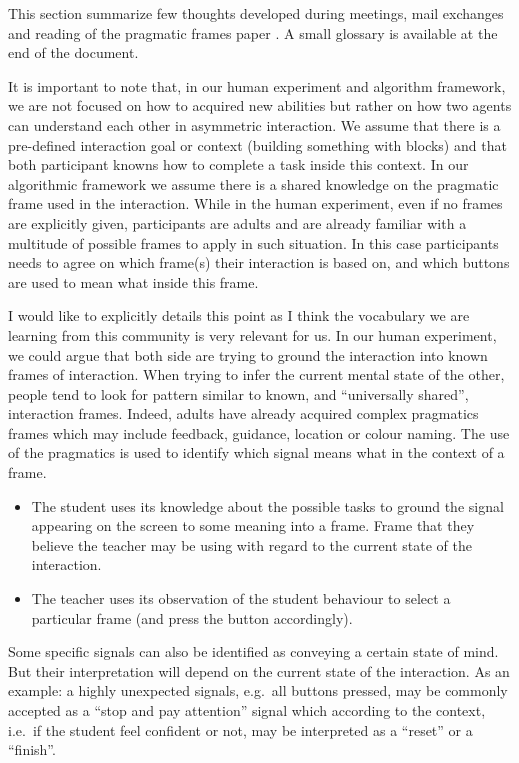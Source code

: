 This section summarize few thoughts developed during meetings, mail exchanges and reading of the pragmatic frames paper \cite{rohlfing2013learning}. A small glossary is available at the end of the document.

It is important to note that, in our human experiment and algorithm framework, we are not focused on how to acquired new abilities but rather on how two agents can understand each other in asymmetric interaction. We assume that there is a pre-defined interaction goal or context (building something with blocks) and that both participant knowns how to complete a task inside this context. In our algorithmic framework we assume there is a shared knowledge on the pragmatic frame used in the interaction. While in the human experiment, even if no frames are explicitly given, participants are adults and are already familiar with a multitude of possible frames to apply in such situation. In this case participants needs to agree on which frame(s) their interaction is based on, and which buttons are used to mean what inside this frame.

I would like to explicitly details this point as I think the vocabulary we are learning from this community is very relevant for us. In our human experiment, we could argue that both side are trying to ground the interaction into known frames of interaction. When trying to infer the current mental state of the other, people tend to look for pattern similar to known, and ``universally shared'', interaction frames. Indeed, adults have already acquired complex pragmatics frames which may include feedback, guidance, location or colour naming. The use of the pragmatics is used to identify which signal means what in the context of a frame.
\begin{itemize}
    \item The student uses its knowledge about the possible tasks to ground the signal appearing on the screen to some meaning into a frame. Frame that they believe the teacher may be using with regard to the current state of the interaction.
    \item The teacher uses its observation of the student behaviour to select a particular frame (and press the button accordingly).
\end{itemize}
Some specific signals can also be identified as conveying a certain state of mind. But their interpretation will depend on the current state of the interaction. As an example: a highly unexpected signals, e.g.\ all buttons pressed, may be commonly accepted as a ``stop and pay attention'' signal which according to the context, i.e.\ if the student feel confident or not, may be interpreted as a ``reset'' or a ``finish''.
\\

